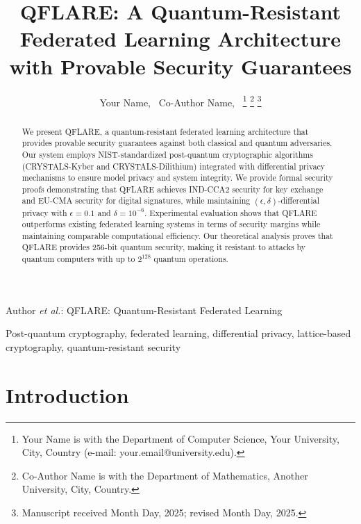 \documentclass[journal]{IEEEtran}
\begin{document}
\title{QFLARE: A Quantum-Resistant Federated Learning Architecture with Provable Security Guarantees}

\author{Your Name,~
        Co-Author Name,~
\thanks{Your Name is with the Department of Computer Science, Your University, City, Country (e-mail: your.email@university.edu).}
\thanks{Co-Author Name is with the Department of Mathematics, Another University, City, Country.}
\thanks{Manuscript received Month Day, 2025; revised Month Day, 2025.}}

%
{Author \MakeLowercase{\textit{et al.}}: QFLARE: Quantum-Resistant Federated Learning}

\maketitle

\begin{abstract}
We present QFLARE, a quantum-resistant federated learning architecture that provides provable security guarantees against both classical and quantum adversaries. Our system employs NIST-standardized post-quantum cryptographic algorithms (CRYSTALS-Kyber and CRYSTALS-Dilithium) integrated with differential privacy mechanisms to ensure model privacy and system integrity. We provide formal security proofs demonstrating that QFLARE achieves IND-CCA2 security for key exchange and EU-CMA security for digital signatures, while maintaining $(\epsilon, \delta)$-differential privacy with $\epsilon = 0.1$ and $\delta = 10^{-6}$. Experimental evaluation shows that QFLARE outperforms existing federated learning systems in terms of security margins while maintaining comparable computational efficiency. Our theoretical analysis proves that QFLARE provides 256-bit quantum security, making it resistant to attacks by quantum computers with up to $2^{128}$ quantum operations.
\end{abstract}

\begin{IEEEkeywords}
Post-quantum cryptography, federated learning, differential privacy, lattice-based cryptography, quantum-resistant security
\end{IEEEkeywords}

\IEEEpeerreviewmaketitle

\section{Introduction}
\end{document}
